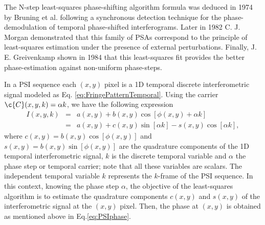 The N-step least-squares phase-shifting algorithm formula was deduced in
1974 by Bruning et al. \cite{Bruning:74} following a synchronous detection 
technique for the phase-demodulation of temporal phase-shifted interferograms. 
Later in 1982 C. J. Morgan \cite{Morgan} demonstrated that this family of PSAs 
correspond to the principle of least-squares estimation under the presence of 
external perturbations. Finally, J. E. Greivenkamp \cite{Greivenkamp} shown in 
1984 that this least-squares fit provides the better phase-estimation against 
non-uniform phase-steps.

In a PSI sequence each $(x,y)$ pixel is a 1D temporal discrete interferometric 
signal modeled as Eq. \eqref{eq:FringePatternTemporal}. Using the carrier 
$\c{C}(x,y,k)=\alpha k$, we have the following expression
\begin{eqnarray}
  I(x,y,k) &=& a(x,y) + b(x,y)\cos[\phi(x,y) +\alpha k] \nonumber \\
  &=& a(x,y) + c(x,y)\sin[\alpha k] - s(x,y)\cos[\alpha k],
  \label{eq:PSI_Sequence}
\end{eqnarray}
where $c(x,y)=b(x,y)\cos[\phi(x,y)]$ and
$s(x,y)=b(x,y)\sin[\phi(x,y)]$ are the quadrature components of the
1D temporal interferometric signal, $k$ is the discrete temporal
variable and $\alpha$ the phase step or temporal carrier; note that
all these variables are scalars. The independent temporal variable $k$
represents the $k$-frame of the PSI sequence. In this context, knowing
the phase step $\alpha$, the objective of the least-squares algorithm is to 
estimate the quadrature components $c(x,y)$ and $s(x,y)$ of the interferometric
signal at the $(x,y)$ pixel. Then, the phase at $(x,y)$ is obtained as 
mentioned above in Eq.\eqref{eq:PSIphase}.

